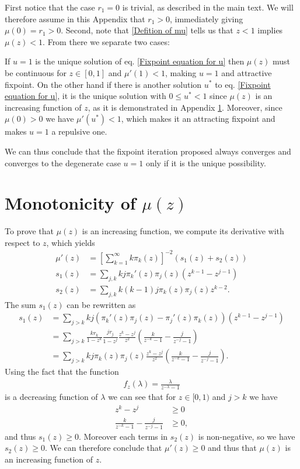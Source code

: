 \documentclass[
11pt, %
american, %
singlespacing, %
final, %
nolistspacing, %
liststotoc, %
headsepline, %
]{MastersDoctoralThesis} %
\begin{document}
First notice that the case $r_1 = 0$ is trivial, as described in the main text. We will therefore assume in this Appendix that $r_1 > 0$, immediately giving $\mu(0) = r_1 > 0$. Second, note that \eqref{Defition of mu} tells us that $z < 1$ implies $\mu(z) < 1$. From there we separate two cases:

If $u = 1$ is the unique solution of eq. \eqref{Fixpoint equation for u} then $\mu(z)$ must be continuous for $z \in [0, 1]$ and $\mu'(1) < 1$, making $u = 1$ and attractive fixpoint. On the other hand if there is another solution $u^*$ to eq. \eqref{Fixpoint equation for u}, it is the unique solution with $0 \leq u^* < 1$ since $\mu(z)$ is an increasing function of $z$, as it is demonstrated in Appendix \ref{Appendix: Monotonicity}. Moreover, since $\mu(0) > 0$ we have $\mu'(u^*) < 1$, which makes it an attracting fixpoint and makes $u = 1$ a repulsive one.

We can thus conclude that the fixpoint iteration proposed always converges and converges to the degenerate case $u = 1$ only if it is the unique possibility.

\section{Monotonicity of $\mu(z)$}
\label{Appendix: Monotonicity}

To prove that $\mu(z)$ is an increasing function, we compute its derivative with respect to $z$, which yields
\begin{align}
	\mu'(z) &= \left[\sum_{k = 1}^{\infty}k \pi_k(z)\right]^{-2} \left(s_1(z) + s_2(z)\right) \\
	s_1(z) &= \sum_{j, k}k j \pi_k'(z) \pi_j(z) \left( z^{k-1} -  z^{j-1}\right) \\
	s_2(z) &= \sum_{j, k} k (k - 1) j \pi_k(z) \pi_j(z) z^{k-2}.
\end{align}
The sum $s_1(z)$ can be rewritten as
\begin{align}
	s_1(z) &= \sum_{j > k} k j \left(\pi_k'(z) \pi_j(z) - \pi_j'(z) \pi_k(z)\right) \left(z^{k-1} -  z^{j-1}\right) \\
		&=\sum_{j > k} \frac{k r_k}{1 - z^k} \frac{j r_j}{1 - z^j} \frac{z^k - z^j}{z^2} \left(\frac{k}{z^{-k} - 1} - \frac{j}{z^{-j} - 1}\right)\\
		&=\sum_{j > k} k j \pi_k(z) \pi_j(z) \frac{z^k - z^j}{z^2} \left(\frac{k}{z^{-k} - 1} - \frac{j}{z^{-j} - 1}\right).
\end{align}
Using the fact that the function
\begin{align}
	f_z(\lambda) = \frac{\lambda}{z^{-\lambda} - 1}
\end{align}
is a decreasing function of $\lambda$ we can see that for $z \in [0, 1)$ and $j > k$ we have
\begin{align}
	z^k - z^j &\geq 0 \\
	\frac{k}{z^{-k} - 1} - \frac{j}{z^{-j} - 1} &\geq 0,
\end{align}
and thus $s_1(z) \geq 0$. Moreover each terms in $s_2(z)$ is non-negative, so we have $s_2(z) \geq 0$. We can therefore conclude that $\mu'(z) \geq 0$ and thus that $\mu(z)$ is an increasing function of $z$.
\end{document}
